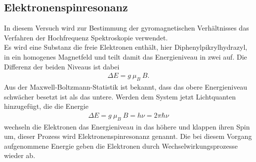 \subsection{Elektronenspinresonanz}
In diesem Versuch wird zur Bestimmung der gyromagnetischen Verhältnisses das Verfahren der Hochfrequenz Spektroskopie verwendet.\\
Es wird eine Substanz die freie Elektronen enthält, hier Diphenylpikrylhydrazyl, in ein homogenes Magnetfeld und teilt damit das Energieniveau in zwei auf. Die Differenz der beiden Niveaus ist dabei 
\begin{align}
	\Delta E = g\ \mu_B \ B.
\end{align}
Aus der Maxwell-Boltzmann-Statistik ist bekannt, dass das obere Energieniveau schwächer besetzt ist als das untere. Werden dem System jetzt Lichtquanten hinzugefügt, die die Energie 
\begin{align}
	\Delta E = g\ \mu_B \ B = h\nu=2\pi\hbar\nu
	\label{eq:energie}
\end{align}
wechseln die Elektronen das Energieniveau in das höhere und klappen ihren Spin um, dieser Prozess wird Elektronenspinresonanz genannt.
Die bei diesem Vorgang aufgenommene Energie geben die Elektronen durch Wechselwirkungsprozesse wieder ab. 

{ %

}


